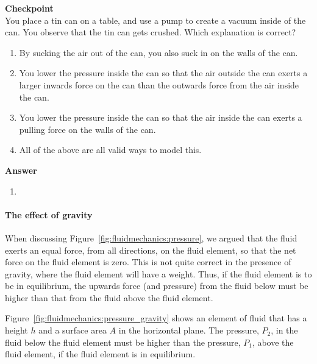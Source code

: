 \begin{framed}
\textbf{Checkpoint}\\
You place a tin can on a table, and use a pump to create a vacuum inside of the can. You observe that the tin can gets crushed. Which explanation is correct?

\begin{enumerate}
\item By sucking the air out of the can, you also suck in on the walls of the can.
\item You lower the pressure inside the can so that the air outside the can exerts a larger inwards force on the can than the outwards force from the air inside the can.
\item You lower the pressure inside the can so that the air inside the can exerts a pulling force on the walls of the can.
\item All of the above are all valid ways to model this.
\end{enumerate}

\begin{framed}
\textbf{Answer}\\
\begin{enumerate}[resume]
\item
\end{enumerate}
\end{framed}
\end{framed}

\paragraph{The effect of gravity}

When discussing Figure~\ref{fig:fluidmechanics:pressure}, we argued that the fluid exerts an equal force, from all directions, on the fluid element, so that the net force on the fluid element is zero. This is not quite correct in the presence of gravity, where the fluid element will have a weight. Thus, if the fluid element is to be in equilibrium, the upwards force (and pressure) from the fluid below must be higher than that from the fluid above the fluid element.

Figure~\ref{fig:fluidmechanics:pressure_gravity} shows an element of fluid that has a height $h$ and a surface area $A$ in the horizontal plane. The pressure, $P_2$, in the fluid below the fluid element must be higher than the pressure, $P_1$, above the fluid element, if the fluid element is in equilibrium.


